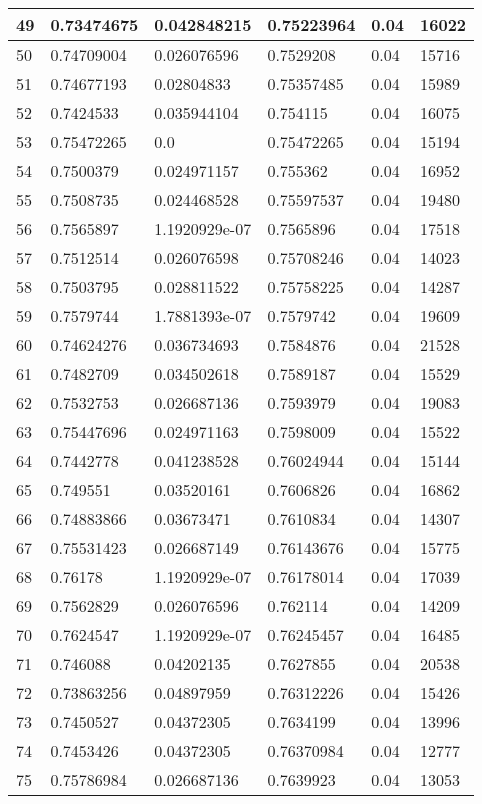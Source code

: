 \begin{longtable}{|l|l|l|l|l|l|}
49 & 0.73474675 & 0.042848215 & 0.75223964 & 0.04 & 16022 \\ \hline 
50 & 0.74709004 & 0.026076596 & 0.7529208 & 0.04 & 15716 \\ \hline 
51 & 0.74677193 & 0.02804833 & 0.75357485 & 0.04 & 15989 \\ \hline 
52 & 0.7424533 & 0.035944104 & 0.754115 & 0.04 & 16075 \\ \hline 
53 & 0.75472265 & 0.0 & 0.75472265 & 0.04 & 15194 \\ \hline 
54 & 0.7500379 & 0.024971157 & 0.755362 & 0.04 & 16952 \\ \hline 
55 & 0.7508735 & 0.024468528 & 0.75597537 & 0.04 & 19480 \\ \hline 
56 & 0.7565897 & 1.1920929e-07 & 0.7565896 & 0.04 & 17518 \\ \hline 
57 & 0.7512514 & 0.026076598 & 0.75708246 & 0.04 & 14023 \\ \hline 
58 & 0.7503795 & 0.028811522 & 0.75758225 & 0.04 & 14287 \\ \hline 
59 & 0.7579744 & 1.7881393e-07 & 0.7579742 & 0.04 & 19609 \\ \hline 
60 & 0.74624276 & 0.036734693 & 0.7584876 & 0.04 & 21528 \\ \hline 
61 & 0.7482709 & 0.034502618 & 0.7589187 & 0.04 & 15529 \\ \hline 
62 & 0.7532753 & 0.026687136 & 0.7593979 & 0.04 & 19083 \\ \hline 
63 & 0.75447696 & 0.024971163 & 0.7598009 & 0.04 & 15522 \\ \hline 
64 & 0.7442778 & 0.041238528 & 0.76024944 & 0.04 & 15144 \\ \hline 
65 & 0.749551 & 0.03520161 & 0.7606826 & 0.04 & 16862 \\ \hline 
66 & 0.74883866 & 0.03673471 & 0.7610834 & 0.04 & 14307 \\ \hline 
67 & 0.75531423 & 0.026687149 & 0.76143676 & 0.04 & 15775 \\ \hline 
68 & 0.76178 & 1.1920929e-07 & 0.76178014 & 0.04 & 17039 \\ \hline 
69 & 0.7562829 & 0.026076596 & 0.762114 & 0.04 & 14209 \\ \hline 
70 & 0.7624547 & 1.1920929e-07 & 0.76245457 & 0.04 & 16485 \\ \hline 
71 & 0.746088 & 0.04202135 & 0.7627855 & 0.04 & 20538 \\ \hline 
72 & 0.73863256 & 0.04897959 & 0.76312226 & 0.04 & 15426 \\ \hline 
73 & 0.7450527 & 0.04372305 & 0.7634199 & 0.04 & 13996 \\ \hline 
74 & 0.7453426 & 0.04372305 & 0.76370984 & 0.04 & 12777 \\ \hline 
75 & 0.75786984 & 0.026687136 & 0.7639923 & 0.04 & 13053 \\ \hline 
\end{longtable}